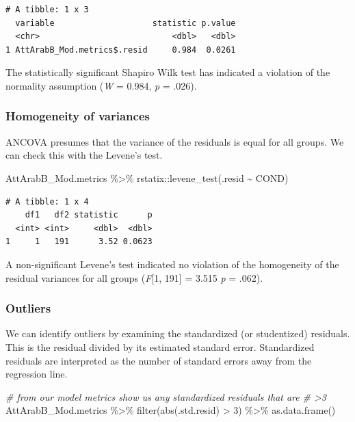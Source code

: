 \documentclass[
  11pt,
]{book}
\newenvironment{Shaded}{\begin{snugshade}}{\end{snugshade}}
\newcommand{\CommentTok}[1]{\textcolor[rgb]{0.56,0.35,0.01}{\textit{#1}}}
\newcommand{\DecValTok}[1]{\textcolor[rgb]{0.00,0.00,0.81}{#1}}
\newcommand{\FunctionTok}[1]{\textcolor[rgb]{0.00,0.00,0.00}{#1}}
\newcommand{\NormalTok}[1]{#1}
\newcommand{\SpecialCharTok}[1]{\textcolor[rgb]{0.00,0.00,0.00}{#1}}
\begin{document}
\begin{verbatim}
# A tibble: 1 x 3
  variable                    statistic p.value
  <chr>                           <dbl>   <dbl>
1 AttArabB_Mod.metrics$.resid     0.984  0.0261
\end{verbatim}

The statistically significant Shapiro Wilk test has indicated a violation of the normality assumption (\emph{W} = 0.984, \emph{p} = .026).

\hypertarget{homogeneity-of-variances}{%
\subsubsection{Homogeneity of variances}\label{homogeneity-of-variances}}

ANCOVA presumes that the variance of the residuals is equal for all groups. We can check this with the Levene's test.

\begin{Shaded}
\begin{Highlighting}[]
\NormalTok{AttArabB\_Mod.metrics }\SpecialCharTok{\%\textgreater{}\%}
\NormalTok{    rstatix}\SpecialCharTok{::}\FunctionTok{levene\_test}\NormalTok{(.resid }\SpecialCharTok{\textasciitilde{}}\NormalTok{ COND)}
\end{Highlighting}
\end{Shaded}

\begin{verbatim}
# A tibble: 1 x 4
    df1   df2 statistic      p
  <int> <int>     <dbl>  <dbl>
1     1   191      3.52 0.0623
\end{verbatim}

A non-significant Levene's test indicated no violation of the homogeneity of the residual variances for all groups (\emph{F}{[}1, 191{]} = 3.515 \emph{p} = .062).

\hypertarget{outliers}{%
\subsubsection{Outliers}\label{outliers}}

We can identify outliers by examining the standardized (or studentized) residuals. This is the residual divided by its estimated standard error. Standardized residuals are interpreted as the number of standard errors away from the regression line.

\begin{Shaded}
\begin{Highlighting}[]
\CommentTok{\# from our model metrics show us any standardized residuals that are}
\CommentTok{\# \textgreater{}3}
\NormalTok{AttArabB\_Mod.metrics }\SpecialCharTok{\%\textgreater{}\%}
    \FunctionTok{filter}\NormalTok{(}\FunctionTok{abs}\NormalTok{(.std.resid) }\SpecialCharTok{\textgreater{}} \DecValTok{3}\NormalTok{) }\SpecialCharTok{\%\textgreater{}\%}
    \FunctionTok{as.data.frame}\NormalTok{()}
\end{Highlighting}
\end{Shaded}
\end{document}
